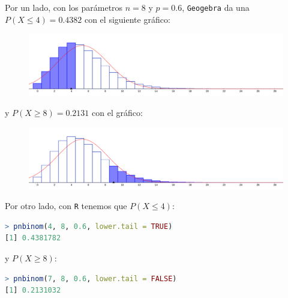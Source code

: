 \begin{sol}
	Por un lado, con los parámetros $n=8$ y $p=0.6$, \texttt{Geogebra} da una $P(X\leq 4) = 0.4382$ con el siguiente gráfico:
	\begin{figure}[H]
	\includegraphics[width=0.5\linewidth]{pics/g9-1}
	\centering
	\end{figure}\noindent
	y $P(X\geq 8) = 0.2131$ con el gráfico:
	\begin{figure}[H]
	\includegraphics[width=0.5\linewidth]{pics/g9-2}
	\centering
	\end{figure}\noindent
	Por otro lado, con \texttt{R} tenemos que $P(X\leq 4)$:
	\begin{lstlisting}[language=R]
> pnbinom(4, 8, 0.6, lower.tail = TRUE)
[1] 0.4381782
	\end{lstlisting}
	y $P(X\geq 8)$:
	\begin{lstlisting}[language=R]
> pnbinom(7, 8, 0.6, lower.tail = FALSE)
[1] 0.2131032
	\end{lstlisting}
\end{sol}

